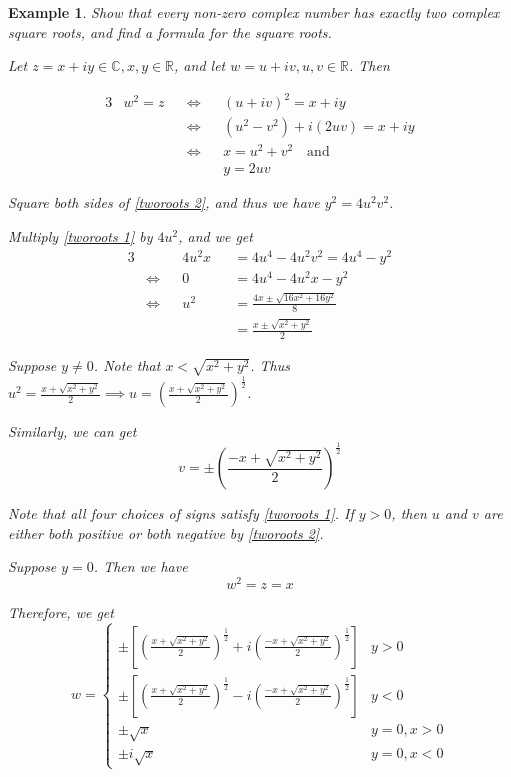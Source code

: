 \documentclass[11pt, oneside]{book}
\theoremstyle{break}
\newtheorem{eg}{Example}[section]
\begin{document}
\begin{eg}
	\label{eg:complex number has exactly two roots}
	Show that every non-zero complex number has exactly two complex square roots, and find a formula for the square roots.

	Let $z = x + iy \in \mathbb{C}, x, y \in \mathbb{R}$, and let $w = u + iv, u, v \in \mathbb{R}$. Then

	\begin{alignat}{3}
		&w^2 = z &&\iff && (u + iv)^2 = x + iy \nonumber \\
		&	&&\iff 	&& (u^2 - v^2) + i(2uv) = x + iy \nonumber \\
		&	&&\iff && x = u^2 + v^2 \quad \text{and} \label{tworoots 1} \\
		&	&&	   && y = 2uv \label{tworoots 2}
	\end{alignat}

	Square both sides of \cref{tworoots 2}, and thus we have $y^2 = 4u^2 v^2$.

	Multiply \cref{tworoots 1} by $4u^2$, and we get
	\begin{alignat*}{3}
		& 	  &&4u^2 x &&= 4u^4 - 4u^2 v^2 = 4u^4 - y^2 \\
		&\iff &&0 	&&= 4u^4 - 4u^2 x - y^2 \\
		&\iff &&u^2 &&= \frac{4x \pm \sqrt{16x^2 + 16y^2}}{8} \\
		&	  &&	&&= \frac{x \pm \sqrt{x^2 + y^2}}{2} 
	\end{alignat*}

	Suppose $y \neq 0$. Note that $x < \sqrt{x^2 + y^2}$. Thus $u^2 = \frac{x + \sqrt{x^2 + y^2}}{2} \implies u = \left(\frac{x + \sqrt{x^2 + y^2}}{2} \right)^{\frac{1}{2}}$.

	Similarly, we can get
	\begin{equation*}
		v = \pm \left(\frac{-x + \sqrt{x^2 + y^2}}{2}\right)^{\frac{1}{2}}
	\end{equation*}

	Note that all four choices of signs satisfy \cref{tworoots 1}. If $y > 0$, then $u$ and $v$ are either both positive or both negative by \cref{tworoots 2}.

	Suppose $y = 0$. Then we have
	\begin{equation*}
		w^2 = z = x
	\end{equation*}

	Therefore, we get
	\begin{equation*}
		w = \begin{cases}
			\pm \left[ \left(\frac{x + \sqrt{x^2 + y^2}}{2} \right)^{\frac{1}{2}} + i \left( \frac{-x + \sqrt{x^2 + y^2}}{2} \right)^{\frac{1}{2}} \right] & y > 0 \\
			\pm \left[ \left(\frac{x + \sqrt{x^2 + y^2}}{2} \right)^{\frac{1}{2}} - i \left(\frac{-x + \sqrt{x^2 + y^2}}{2} \right)^{\frac{1}{2}} \right] & y < 0 \\
			\pm \sqrt{x} & y = 0, x > 0 \\
			\pm i \sqrt{x} & y = 0, x < 0
		\end{cases}
	\end{equation*}
\end{eg}
\end{document}
